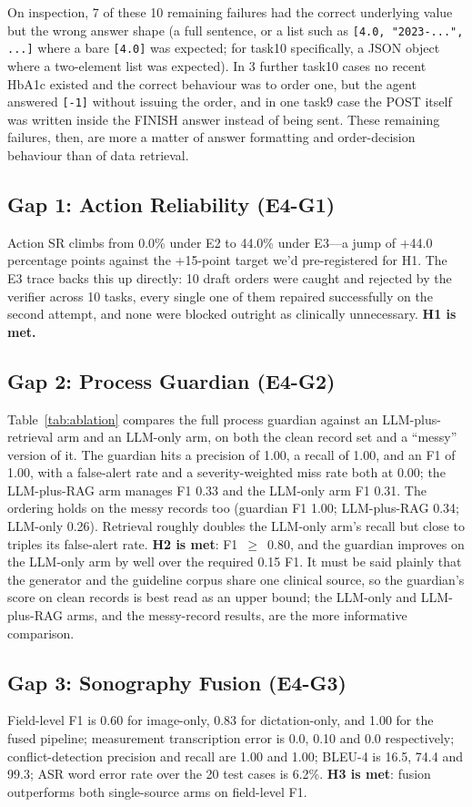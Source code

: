 \documentclass[conference]{IEEEtran}
\begin{document}
On inspection, 7 of these 10 remaining failures had the correct underlying value but the wrong answer shape (a full sentence, or a list such as \texttt{[4.0, "2023-...", ...]} where a bare \texttt{[4.0]} was expected; for task10 specifically, a JSON object where a two-element list was expected). In 3 further task10 cases no recent HbA1c existed and the correct behaviour was to order one, but the agent answered \texttt{[-1]} without issuing the order, and in one task9 case the POST itself was written inside the FINISH answer instead of being sent. These remaining failures, then, are more a matter of answer formatting and order-decision behaviour than of data retrieval.

\subsection{Gap 1: Action Reliability (E4-G1)}
Action SR climbs from 0.0\% under E2 to 44.0\% under E3---a jump of +44.0 percentage points against the +15-point target we'd pre-registered for H1. The E3 trace backs this up directly: 10 draft orders were caught and rejected by the verifier across 10 tasks, every single one of them repaired successfully on the second attempt, and none were blocked outright as clinically unnecessary. \textbf{H1 is met.}

\subsection{Gap 2: Process Guardian (E4-G2)}
Table~\ref{tab:ablation} compares the full process guardian against an LLM-plus-retrieval arm and an LLM-only arm, on both the clean record set and a ``messy'' version of it. The guardian hits a precision of 1.00, a recall of 1.00, and an F1 of 1.00, with a false-alert rate and a severity-weighted miss rate both at 0.00; the LLM-plus-RAG arm manages F1 0.33 and the LLM-only arm F1 0.31. The ordering holds on the messy records too (guardian F1 1.00; LLM-plus-RAG 0.34; LLM-only 0.26). Retrieval roughly doubles the LLM-only arm's recall but close to triples its false-alert rate. \textbf{H2 is met}: F1~$\geq$~0.80, and the guardian improves on the LLM-only arm by well over the required 0.15 F1. It must be said plainly that the generator and the guideline corpus share one clinical source, so the guardian's score on clean records is best read as an upper bound; the LLM-only and LLM-plus-RAG arms, and the messy-record results, are the more informative comparison.

\subsection{Gap 3: Sonography Fusion (E4-G3)}
Field-level F1 is 0.60 for image-only, 0.83 for dictation-only, and 1.00 for the fused pipeline; measurement transcription error is 0.0, 0.10 and 0.0 respectively; conflict-detection precision and recall are 1.00 and 1.00; BLEU-4 is 16.5, 74.4 and 99.3; ASR word error rate over the 20 test cases is 6.2\%. \textbf{H3 is met}: fusion outperforms both single-source arms on field-level F1.
\end{document}
